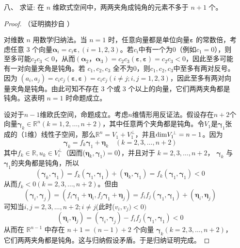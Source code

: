 \begin{enumerate}[1~]
\item[八、]
求证: 在 $n$ 维欧式空间中，两两夹角成钝角的元素不多于 $n + 1$ 个。

\begin{proof}（证明摘抄自 \cite{zhugao}）

对维数 $n$ 用数学归纳法。当 $n = 1$ 时，任意向量都是单位向量$ {\boldsymbol{\varepsilon}}$ 的常数倍，考虑任意 3 个向量$ {\boldsymbol{\alpha}}_i = c_i { \boldsymbol{\varepsilon}}, (i = 1, 2, 3)$。若$c_i$中有一个为0（例如$c_1 = 0$），则至多可能$c_2c_3 < 0$，从而$( {\boldsymbol{\alpha}}_2， {\boldsymbol{\alpha}}_3) = c_2c_3( {\boldsymbol{\varepsilon}},  {\boldsymbol{\varepsilon}})= c_2c_3 < 0$，因此至多可能有一对向量夹角是钝角。若 $c_1, c_2, c_3$ 全不为0，则$c_1, c_2, c_3$中至多有两对反号。因为 $(a_i, a_j) = c_ic_j ( {\boldsymbol{\varepsilon}}, {\boldsymbol{\varepsilon}}) = c_ic_j(i \neq j; i, j = 1, 2, 3)$，因此至多有两对向量夹角是钝角。由此可知不存在 $3$ 个或 $3$ 个以上的向量，它们两两夹角都是钝角。这表明 $n=1$ 时命题成立。

设对于$n-1$维欧氏空间，命题成立。考虑$n$维情形用反证法。假设存在$n+2$个向量$ {\boldsymbol{\gamma}}_k \in \mathbb{R}^n(k = 1, 2, \dots, n + 2)$，其中任意两个夹角都是钝角。令$ {V}_1$是$ {\boldsymbol{\gamma}}_1$张成的（1维）线性子空间，那么$\mathbb{R}^n =  {V}_1 +  {V}_1^{\perp}$，并且${\rm \dim}  {V}_1^{\perp} = n-1$。因为\[
  { \boldsymbol{\gamma}}_{k}=f_{k}   { \boldsymbol{\gamma}}_{1}+{ \boldsymbol{\eta} }_{k} \quad (k = 2,3 , \dots , n + 2 )
\]
其中$f_k \in \mathbb{R}, {u}_k \in  {V}_i^{\perp}$（因而($ {\boldsymbol{\eta}}_k,  {\boldsymbol{\gamma}}_1) = 0$），并且对于 $k = 2, 3, \dots, n+2$， $ {\boldsymbol{\gamma}}_k$ 与 $ {\boldsymbol{\gamma}}_1$的夹角都是钝角，所以\[
\left({\boldsymbol{\gamma}}_{k}, {\boldsymbol{\gamma} }_{1} \right) = f_{k} \left(   { \boldsymbol{\gamma}}_{1}, { \boldsymbol{\gamma}} _ { 1 } \right) + \left( {\boldsymbol{\eta}}_{k}, {\boldsymbol{\gamma}} _ { 1 } \right) = f_{k} \left( {\boldsymbol{\gamma} }_{1}, {\boldsymbol{\gamma} }_{1} \right) < 0
\]
从而$f_{k} < 0 ( k = 2,3 , \dots , n + 2 )$。但由\[
\left({\boldsymbol{\gamma} } _ { i } ,  { \boldsymbol{\gamma} } _ { j } \right) = \left( f _ { i }  { \boldsymbol{\gamma} } _ { 1 } +  { \boldsymbol{\eta} } _ { i } , f _ { j }  { \boldsymbol{\gamma} } _ { 1 } +  { \boldsymbol{\eta} } _ { j } \right) = f _ { i } f _ { j } \left(  { \boldsymbol{\gamma} } _ { 1 } ,  { \boldsymbol{\gamma} } _ { 1 } \right) + \left(  { \boldsymbol{\eta} } _ { i } ,  { \boldsymbol{\eta} } _ { j } \right)
\]
可知当$ i , j = 2,3 , \dots , n + 2 ; i \neq j$(此时($v_i, v_j)<0)$\[
\left(  { \boldsymbol{\eta} } _ { i } ,  { \boldsymbol{\eta} } _ { j } \right) = \left(  { \boldsymbol{\gamma} } _ { i } ,  { \boldsymbol{\gamma} } _ { j } \right) - f _ { i } f _ { j } \left(  { \boldsymbol{\gamma} } _ { 1 } ,  { \boldsymbol{\gamma} } _ { 1 } \right) < 0
\]
从而在 $\mathbb{R}^{n-1}$ 中存在 $n+1 = (n-1) + 2$ 个向量 $ {\boldsymbol{\gamma}}_k(k = 2, 3, \dots, n+2)$，它们两两夹角都是钝角。这与归纳假设矛盾。于是归纳证明完成。
\end{proof}

\end{enumerate}
\endinput